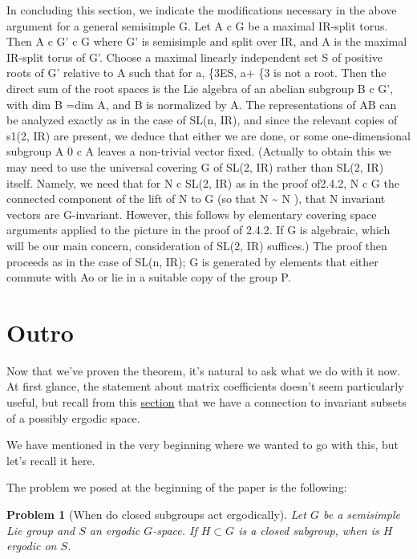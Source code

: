 \documentclass[
  12pt
]{article}
\theoremstyle{break}
\newtheorem*{problem}{Problem}
\theoremstyle{plain}
\newcommand{\G}{\ensuremath{G}\xspace}
\begin{document}
   In concluding this section, we indicate the
  modifications necessary in the above argument for a general semisimple
  G. Let A c G be a maximal IR-split torus. Then A c G' c G where G' is
  semisimple and split over IR, and A is the maximal IR-split torus of G'.
  Choose a maximal linearly independent set S of positive roots of G'
  relative to A such that for a, \{3ES, a+ \{3 is not a root. Then the
  direct sum of the root spaces is the Lie algebra of an abelian subgroup
  B c G', with dim B =dim A, and B is normalized by A. The representations
  of AB can be analyzed exactly as in the case of SL(n, IR), and since the
  relevant copies of s1(2, IR) are present, we deduce that either we are
  done, or some one-dimensional subgroup A 0 c A leaves a non-trivial
  vector fixed. (Actually to obtain this we may need to use the universal
  covering G of SL(2, IR) rather than SL(2, IR) itself. Namely, we need
  that for N c SL(2, IR) as in the proof of2.4.2, N c G the connected
  component of the lift of N to G (so that N \textasciitilde{} N ), that N
  invariant vectors are G-invariant. However, this follows by elementary
  covering space arguments applied to the picture in the proof of 2.4.2.
  If G is algebraic, which will be our main concern, consideration of
  SL(2, IR) suffices.) The proof then proceeds as in the case of SL(n,
  IR); G is generated by elements that either commute with Ao or lie in a
  suitable copy of the group P.




\hypertarget{outro}{%
\section{Outro}\label{outro}}


  Now that we've proven the theorem, it's natural to ask what we do with it now.
  At first glance, the statement about matrix coefficients doesn't seem particularly useful,
  but recall from this \hyperref[the-connection-between-ergodicity-and-unitary-representations]{section}
  that we have a connection to invariant subsets of a possibly ergodic space.

  We have mentioned in the very beginning where we wanted to go with this, but let's recall it here.

  The problem we posed at the beginning of the paper is the following:

  \begin{problem}[When do closed subgroups act ergodically]
    Let \G be a semisimple Lie group and $S$ an ergodic \G-space. If $H\subset G$ is a closed subgroup, when is $H$ ergodic on $S$.
  \end{problem}
\end{document}
